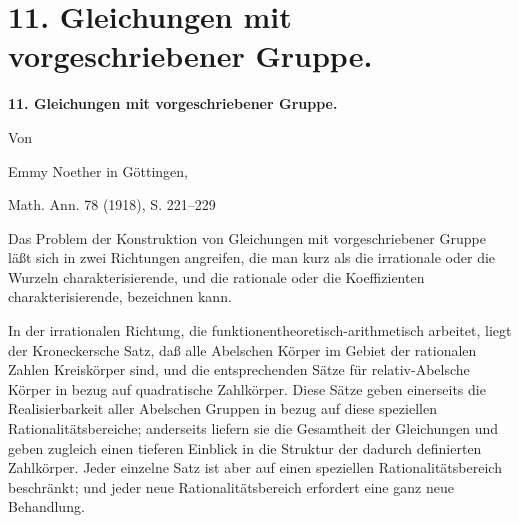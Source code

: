 \section*{11. Gleichungen mit vorgeschriebener Gruppe.}
\begin{center}
{\Large\bfseries 11. Gleichungen mit vorgeschriebener Gruppe.}\par
\vspace{0.75em}
Von\par
\vspace{0.75em}
Emmy Noether in Göttingen,\par
\vspace{1.5em}
Math. Ann. 78 (1918), S. 221--229
\end{center}

\vspace{4em}

Das Problem der Konstruktion von Gleichungen mit vorgeschriebener Gruppe läßt sich in zwei Richtungen angreifen, die man kurz als die \glqq{}irrationale\grqq{} oder die Wurzeln charakterisierende, und die \glqq{}rationale\grqq{} oder die Koeffizienten charakterisierende, bezeichnen kann.

In der \glqq{}irrationalen\grqq{} Richtung, die funktionentheoretisch-arithmetisch arbeitet, liegt der Kroneckersche Satz, daß alle Abelschen Körper im Gebiet der rationalen Zahlen Kreiskörper sind, und die entsprechenden Sätze für relativ-Abelsche Körper in bezug auf quadratische Zahlkörper. Diese Sätze geben einerseits die Realisierbarkeit aller Abelschen Gruppen in bezug auf diese speziellen Rationalitätsbereiche; anderseits liefern sie die Gesamtheit der Gleichungen und geben zugleich einen tieferen Einblick in die Struktur der dadurch definierten Zahlkörper. Jeder einzelne Satz ist aber auf einen speziellen Rationalitätsbereich beschränkt; und jeder neue Rationalitätsbereich erfordert eine ganz neue Behandlung.

